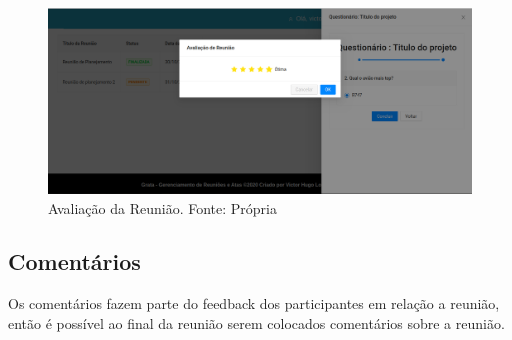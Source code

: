 \begin{figure}[H]
    \centering
    \includegraphics[width=1.0\textwidth]{figuras/avaliacao_reuniao.png}
    \caption{Avaliação da Reunião. Fonte: Própria}
    \label{img:avaliacao_reuniao}
\end{figure}

\subsection{Comentários}

Os comentários fazem parte do feedback dos participantes em relação a reunião, então é possível ao final da reunião serem colocados comentários sobre a reunião.
